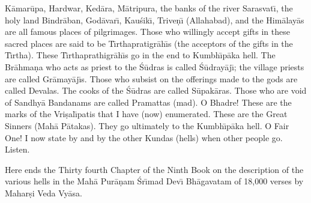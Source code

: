 K\=amar\=upa, Hardwar, Ked\=ara, M\=atripura, the banks of the river Sarasvat\={\i}, the holy land Bindr\=aban, God\=avar\={\i}, Kau\'sik\={\i}, Trive\d{n}\={\i} (Allahabad), and the Him\=alay\=as are all famous places of pilgrimages. Those who willingly accept gifts in these sacred places are said to be T\={\i}rthapratigr\=ah\={\i}s (the acceptors of the gifts in the T\={\i}rtha). These T\={\i}rthaprathigr\=ah\={\i}s go in the end to Kumbh\={\i}p\=aka hell. The Br\=ahma\d{n}a who acts as priest to the \'S\=udras is called \'S\=udray\=aj\={\i}; the village priests are called Gr\=amay\=aj\={\i}s. Those who subsist on the offerings made to the gods are called Devalas. The cooks of the \'S\=udras are called S\=upak\=aras. Those who are void of Sandhy\=a Bandanams are called Pramattas (mad). O Bhadre! These are the marks of the Vri\d{s}al\={\i}patis that I have (now) enumerated. These are the Great Sinners (Mah\=a P\=atakas). They go ultimately to the Kumbh\={\i}p\=aka hell. O Fair One! I now state by and by the other Kundas (hells) when other people go. Listen.

Here ends the Thirty fourth Chapter of the Ninth Book on the description of the various hells in the Mah\=a Pur\=a\d{n}am \'Sr\={\i}mad Dev\={\i} Bh\=agavatam of 18,000 verses by Mahar\d{s}i Veda Vy\=asa.



